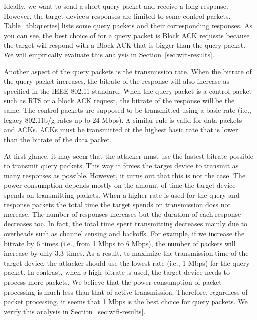 Ideally, we want to send a short query packet and receive a long response. However, the target device's responses are limited to some control packets.
Table~\ref{tbl:queries} lists some query packets and their corresponding responses.
As you can see, the best choice of for a query packet is Block ACK requests because the target will respond with a Block ACK that is bigger than the query packet. We will empirically evaluate this analysis in Section~\ref{sec:wifi-results}.




Another aspect of the query packets is the transmission rate. 
When the bitrate of the query packet increases, the bitrate of the response will also increase as specified in the IEEE 802.11 standard. When the query packet is a control packet such as RTS or a block ACK request, the bitrate of the response will be the same. The control packets are supposed to be transmitted using a basic rate (i.e., legacy 802.11b/g rates up to 24 Mbps). A similar rule is valid for data packets and ACKs. ACKs must be transmitted at the highest basic rate that is lower than the bitrate of the data packet.



At first glance, it may seem that the attacker must use the fastest 
bitrate possible to transmit query packets. This way it forces the target device to transmit as many responses as possible. However, it turns out that this is not the case. The power consumption depends mostly on the amount of time the target device spends on transmitting packets. When a higher rate is used for the query and response packets the total time the target spends on transmission does not increase. The number of responses increases but the duration of each response decreases too.
In fact, the total time spent transmitting decreases mainly due to overheads such as channel sensing and backoffs. For example, if we increase the bitrate by 6 times (i.e., from 1 Mbps to 6 Mbps), the number of packets will increase by only 3.3 times.
As a result, to maximize the transmission time of the target device, the attacker should use the lowest rate (i.e., 1 Mbps) for the query packet.
In contrast, when a high bitrate is used, the target device needs to process more packets. We believe that the power consumption of packet processing is much less than that of active transmission. Therefore, regardless of packet processing, it seems that 1 Mbps is the best choice for query packets. We verify this analysis in Section~\ref{sec:wifi-results}.

